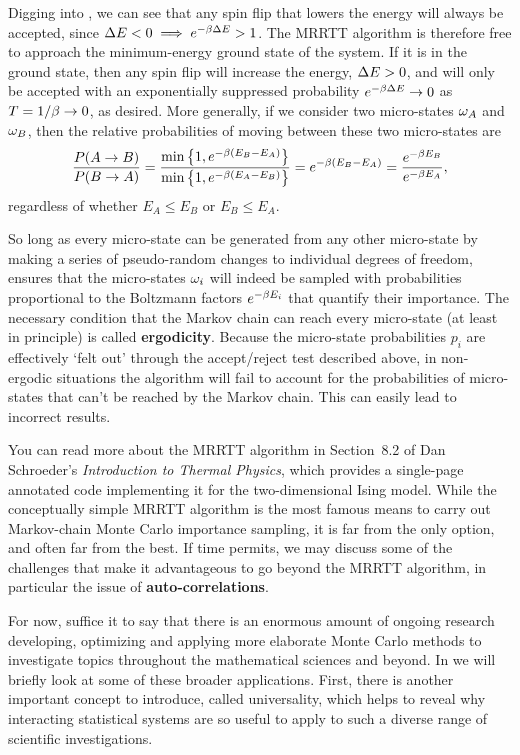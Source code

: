 Digging into , we can see that any spin flip that lowers the energy will always be accepted, since $\Delta E < 0 \implies e^{-\beta \Delta E} > 1$.
The MRRTT algorithm is therefore free to approach the minimum-energy ground state of the system.
If it is in the ground state, then any spin flip will increase the energy, $\Delta E > 0$, and will only be accepted with an exponentially suppressed probability $e^{-\beta \Delta E} \to 0$ as $T = 1 / \beta \to 0$, as desired.
More generally, if we consider two micro-states $\omega_A$ and $\omega_B$, then the relative probabilities of moving between these two micro-states are
\begin{equation}
  \label{eq:MRRTTdistribution}
  \frac{P(A \to B)}{P(B \to A)} = \frac{\mbox{min}\left\{1, e^{-\beta(E_B - E_A)}\right\}}{\mbox{min}\left\{1, e^{-\beta(E_A - E_B)}\right\}} = e^{-\beta(E_B - E_A)} = \frac{e^{-\beta E_B}}{e^{-\beta E_A}},
\end{equation}
regardless of whether $E_A \leq E_B$ or $E_B \leq E_A$.

So long as every micro-state can be generated from any other micro-state by making a series of pseudo-random changes to individual degrees of freedom,  ensures that the micro-states $\omega_i$ will indeed be sampled with probabilities proportional to the Boltzmann factors $e^{-\beta E_i}$ that quantify their importance.
The necessary condition that the Markov chain can reach every micro-state (at least in principle) is called \textbf{ergodicity}.
Because the micro-state probabilities $p_i$ are effectively `felt out' through the accept/reject test described above, in non-ergodic situations the algorithm will fail to account for the probabilities of micro-states that can't be reached by the Markov chain.
This can easily lead to incorrect results.

You can read more about the MRRTT algorithm in Section~8.2 of Dan Schroeder's \textit{Introduction to Thermal Physics}, which provides a single-page annotated code implementing it for the two-dimensional Ising model.
While the conceptually simple MRRTT algorithm is the most famous means to carry out Markov-chain Monte Carlo importance sampling, it is far from the only option, and often far from the best.
If time permits, we may discuss some of the challenges that make it advantageous to go beyond the MRRTT algorithm, in particular the issue of \textbf{auto-correlations}.

For now, suffice it to say that there is an enormous amount of ongoing research developing, optimizing and applying more elaborate Monte Carlo methods to investigate topics throughout the mathematical sciences and beyond.
In  we will briefly look at some of these broader applications.
First, there is another important concept to introduce, called universality, which helps to reveal why interacting statistical systems are so useful to apply to such a diverse range of scientific investigations.



